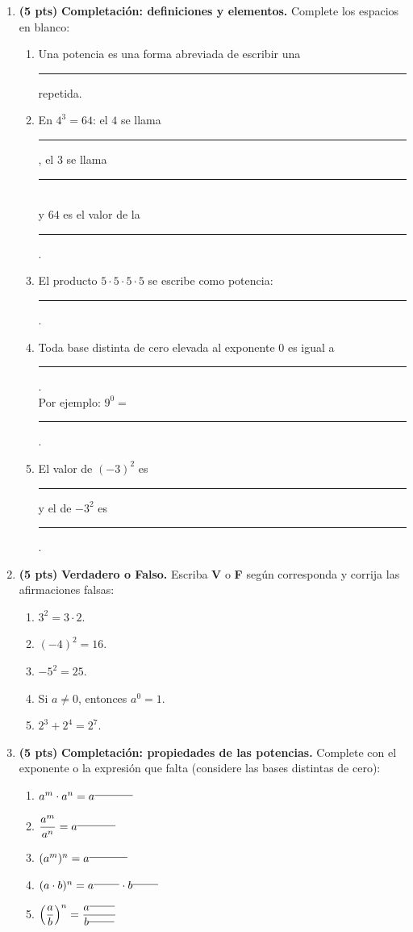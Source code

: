 \documentclass[12pt, letterpaper]{article}
\begin{document}
\begin{enumerate}[leftmargin=*]
  \item \textbf{(5 pts)} \textbf{Completación: definiciones y elementos.} Complete los espacios en blanco:
        \begin{enumerate}[label=\alph*)]
          \item Una potencia es una forma abreviada de escribir una \rule{2.6cm}{0.4pt} repetida.
          \item En $4^{3} = 64$: el $4$ se llama \rule{2cm}{0.4pt}, el $3$ se llama \rule{2cm}{0.4pt} \\ y $64$ es el valor de la \rule{2cm}{0.4pt}.
          \item El producto $5 \cdot 5 \cdot 5 \cdot 5$ se escribe como potencia: \rule{2cm}{0.4pt}.
          \item Toda base distinta de cero elevada al exponente $0$ es igual a \rule{1.5cm}{0.4pt}. \\ Por ejemplo: $9^{0} = $ \rule{1.5cm}{0.4pt}.
          \item El valor de $(-3)^{2}$ es \rule{1.5cm}{0.4pt} y el de $-3^{2}$ es \rule{1.5cm}{0.4pt}.
        \end{enumerate}

  \item \textbf{(5 pts)} \textbf{Verdadero o Falso.} Escriba \textbf{V} o \textbf{F} según corresponda y corrija las afirmaciones falsas:
        \begin{enumerate}[label=\alph*)]
          \item $3^{2} = 3 \cdot 2$.
          \item $(-4)^{2} = 16$.
          \item $-5^{2} = 25$.
          \item Si $a \neq 0$, entonces $a^{0} = 1$.
          \item $2^{3} + 2^{4} = 2^{7}$.
        \end{enumerate}

  \item \textbf{(5 pts)} \textbf{Completación: propiedades de las potencias.} Complete con el exponente o la expresión que falta (considere las bases distintas de cero):
        \begin{enumerate}[label=\alph*)]
          \item $a^{m} \cdot a^{n} = a^{\rule{1.2cm}{0.4pt}}$
          \item $\dfrac{a^{m}}{a^{n}} = a^{\rule{1.2cm}{0.4pt}}$
          \item $(a^{m})^{n} = a^{\rule{1.2cm}{0.4pt}}$
          \item $(a \cdot b)^{n} = a^{\rule{0.8cm}{0.4pt}} \cdot b^{\rule{0.8cm}{0.4pt}}$
          \item $\left(\dfrac{a}{b}\right)^{n} = \dfrac{a^{\rule{0.8cm}{0.4pt}}}{b^{\rule{0.8cm}{0.4pt}}}$
        \end{enumerate}


\end{enumerate}
\end{document}
